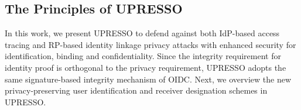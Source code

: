 \subsection{The Principles of UPRESSO}
\label{subsec:solutions}
In this work, we present UPRESSO to defend against both IdP-based access tracing and RP-based identity linkage privacy attacks with enhanced security for identification, binding and confidentiality. %
Since the integrity requirement for identity proof is orthogonal to the privacy requirement, UPRESSO adopts the same signature-based integrity mechanism of OIDC.
Next, we overview the new privacy-preserving user identification and receiver designation schemes in UPRESSO.


